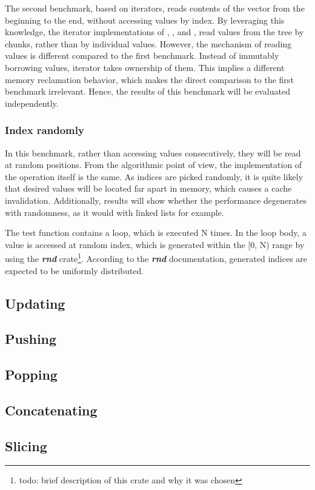The second benchmark, based on iterators, reads contents of the vector from the beginning to the end, without accessing values by index. By leveraging this knowledge, the iterator implementations of \rbvec{}, \rrbvec{}, and \pvec{}, read values from the tree by chunks, rather than by individual values. However, the mechanism of reading values is different compared to the first benchmark. Instead of immutably borrowing values, iterator takes ownership of them. This implies a different memory reclamation behavior, which makes the direct comparison to the first benchmark irrelevant. Hence, the results of this benchmark will be evaluated independently. 

\subsubsection*{Index randomly}
In this benchmark, rather than accessing values consecutively, they will be read at random positions. From the algorithmic point of view, the implementation of the operation itself is the same. As indices are picked randomly, it is quite likely that desired values will be located far apart in memory, which causes a cache invalidation. Additionally, results will show whether the performance degenerates with randomness, as it would with linked lists for example. 

The test function contains a loop, which is executed N times. In the loop body, a value is accessed at random index, which is generated within the [0, N) range by using the \emph{\textbf{rnd}} crate\footnote{todo: brief description of this crate and why it was chosen}. According to the \emph{\textbf{rnd}} documentation, generated indices are expected to be uniformly distributed. 

\subsection{Updating}
\subsection{Pushing}
\subsection{Popping}
\subsection{Concatenating}
\subsection{Slicing}


